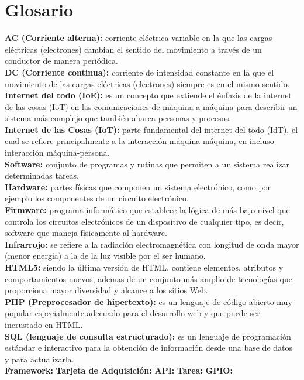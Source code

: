 \chapter{Glosario}

\textbf{AC (Corriente alterna):} corriente eléctrica variable en la que las cargas eléctricas (electrones) cambian el sentido del movimiento a través de un conductor de manera periódica.\\

\textbf{DC (Corriente continua):} corriente de intensidad constante en la que el movimiento de las cargas eléctricas (electrones) siempre es en el mismo sentido.\\

\textbf{Internet del todo (IoE):} es un concepto que extiende el énfasis de la internet de las cosas (IoT) en las comunicaciones de máquina a máquina para describir un sistema más complejo que también abarca personas y procesos.\cite{IOE} \\

\textbf{Internet de las Cosas (IoT):} parte fundamental del internet del todo (IdT), el cual se refiere principalmente a la interacción máquina-máquina, en incluso interacción máquina-persona.\\

\textbf{Software:} conjunto de programas y rutinas que permiten a un sistema realizar determinadas tareas.\\

\textbf{Hardware:} partes físicas que componen un sistema electrónico, como por ejemplo los componentes de un circuito electrónico.\\

\textbf{Firmware:} programa informático que establece la lógica de más bajo nivel que controla los circuitos electrónicos de un dispositivo de cualquier tipo, es decir, software que maneja físicamente al hardware.\\

\textbf{Infrarrojo:} se refiere a la radiación electromagnética con longitud de onda mayor (menor energía) a la de la luz visible por el ser humano.\\

\textbf{HTML5:} siendo la última versión de HTML, contiene elementos, atributos y comportamientos nuevos, ademas de un conjunto más amplio de tecnologías que proporciona mayor diversidad y alcance a los sitios Web. \\

\textbf{PHP (Preprocesador de hipertexto):} es un lenguaje de código abierto muy popular especialmente adecuado para el desarrollo web y que puede ser incrustado en HTML.\\

\textbf{SQL (lenguaje de consulta estructurado):} es un lenguaje de programación estándar e interactivo para la obtención de información desde una base de datos y para actualizarla.\\

\textbf{Framework:}
\textbf{Tarjeta de Adquisición:}
\textbf{API:}
\textbf{Tarea:}
\textbf{GPIO:}